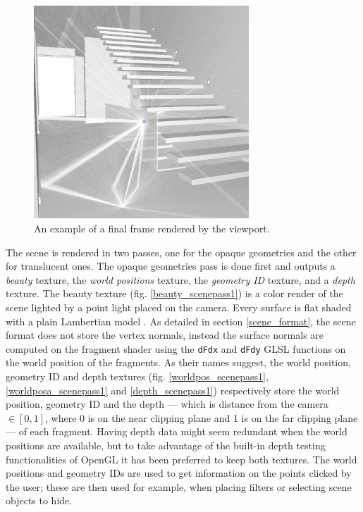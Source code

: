 \begin{figure}
	\centering
	\includegraphics[height=8cm]{chapters/chapter_thetool/viewport_render.pdf}
	\caption{An example of a final frame rendered by the viewport.}
	\label{viewport_render}
\end{figure}

The scene is rendered in two passes, one for the opaque geometries and the other for translucent ones. The opaque geometries pass is done first and outputs a \textit{beauty} texture, the \textit{world positions} texture, the \textit{geometry ID} texture, and a \textit{depth} texture. The beauty texture (fig. \ref{beauty_scenepass1}) is a color render of the scene lighted by a point light placed on the camera. Every surface is flat shaded with a plain Lambertian model \cite{lambert1760photometria}. As detailed in section \ref{scene_format}, the scene format does not store the vertex normals, instead the surface normals are computed on the fragment shader using the \texttt{dFdx} and \texttt{dFdy} GLSL functions on the world position of the fragments. As their names suggest, the world position, geometry ID and depth textures (fig. \ref{worldpos_scenepass1}, \ref{worldposa_scenepass1} and \ref{depth_scenepass1}) respectively store the world position, geometry ID and the depth --- which is distance from the camera $\in[0,1]$, where 0 is on the near clipping plane and 1 is on the far clipping plane --- of each fragment. Having depth data might seem redundant when the world positions are available, but to take advantage of the built-in depth testing functionalities of OpenGL it has been preferred to keep both textures. The world positions and geometry IDs are used to get information on the points clicked by the user; these are then used for example, when placing filters or selecting scene objects to hide.


